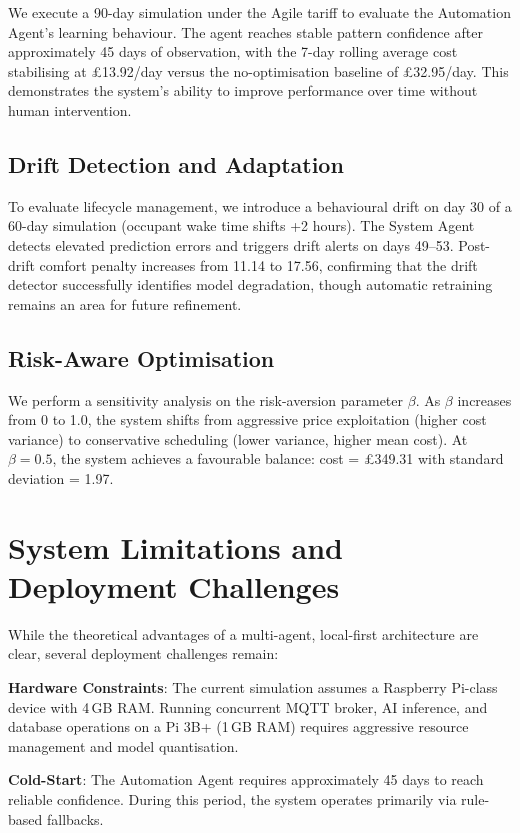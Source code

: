 \documentclass[11pt,a4paper]{article}
\begin{document}
We execute a 90-day simulation under the Agile tariff to evaluate the Automation Agent's learning behaviour. The agent reaches stable pattern confidence after approximately 45 days of observation, with the 7-day rolling average cost stabilising at \pounds13.92/day versus the no-optimisation baseline of \pounds32.95/day. This demonstrates the system's ability to improve performance over time without human intervention.

\subsection{Drift Detection and Adaptation}

To evaluate lifecycle management, we introduce a behavioural drift on day 30 of a 60-day simulation (occupant wake time shifts +2 hours). The System Agent detects elevated prediction errors and triggers drift alerts on days 49--53. Post-drift comfort penalty increases from 11.14 to 17.56, confirming that the drift detector successfully identifies model degradation, though automatic retraining remains an area for future refinement.

\subsection{Risk-Aware Optimisation}

We perform a sensitivity analysis on the risk-aversion parameter $\beta$. As $\beta$ increases from 0 to 1.0, the system shifts from aggressive price exploitation (higher cost variance) to conservative scheduling (lower variance, higher mean cost). At $\beta = 0.5$, the system achieves a favourable balance: cost = \pounds349.31 with standard deviation = 1.97.

\section{System Limitations and Deployment Challenges}

While the theoretical advantages of a multi-agent, local-first architecture are clear, several deployment challenges remain:

\textbf{Hardware Constraints}: The current simulation assumes a Raspberry Pi-class device with 4\,GB RAM. Running concurrent MQTT broker, AI inference, and database operations on a Pi 3B+ (1\,GB RAM) requires aggressive resource management and model quantisation.

\textbf{Cold-Start}: The Automation Agent requires approximately 45 days to reach reliable confidence. During this period, the system operates primarily via rule-based fallbacks.
\end{document}
